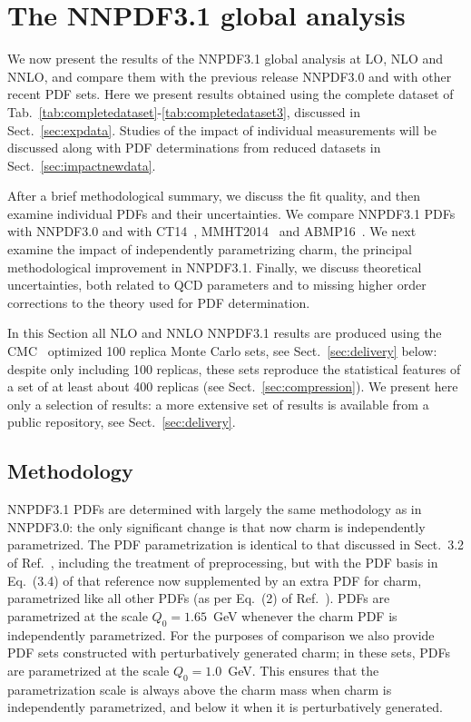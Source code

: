 \newpage
\section{The NNPDF3.1 global analysis}

\label{sec:results}

We now present the results of the NNPDF3.1 global
analysis at LO, NLO and NNLO, and compare them with the previous
release NNPDF3.0 and  with other recent PDF sets.
%
Here we present results obtained using  the complete dataset
of Tab.~\ref{tab:completedataset}-\ref{tab:completedataset3}, discussed 
in Sect.~\ref{sec:expdata}. Studies of the impact of individual
measurements will be discussed along with PDF determinations from reduced
datasets in Sect.~\ref{sec:impactnewdata}. 

After a brief methodological summary, 
we discuss the  fit quality, and 
then examine individual PDFs and their uncertainties.
We compare NNPDF3.1 PDFs with NNPDF3.0 and with  CT14~\cite{Dulat:2015mca}, MMHT2014~\cite{Harland-Lang:2014zoa} 
and ABMP16~\cite{Alekhin:2017kpj}. 
We next examine the impact of independently parametrizing
charm, the principal methodological 
improvement in NNPDF3.1. Finally, we discuss theoretical
uncertainties, both related to QCD parameters 
and to missing higher order corrections to the
theory used for PDF determination.

In this Section all NLO and NNLO NNPDF3.1 results are produced using
the CMC~\cite{Carrazza:2015hva} optimized 100 replica Monte Carlo sets,
see Sect.~\ref{sec:delivery} below: despite only
including 100 replicas, these sets reproduce  the statistical features
of a set of at least about 400 replicas (see 
Sect.~\ref{sec:compression}).  We present here only a selection of
results: a more extensive set of results is available from a public
repository, see  Sect.~\ref{sec:delivery}.

\subsection{Methodology}
\label{sec:methodology}

NNPDF3.1 PDFs are determined with largely the same methodology as in NNPDF3.0:
the only significant change is that now charm is independently
parametrized. The PDF parametrization is identical to that
discussed in Sect.~3.2 of Ref.~\cite{Ball:2014uwa}, including the
treatment of preprocessing, but with the PDF
basis in Eq.~(3.4) of that reference now supplemented by an extra PDF
for charm, parametrized like all other PDFs (as per Eq.~(2) of
Ref.~\cite{Ball:2016neh}).
PDFs are parametrized at the scale $Q_0=1.65$~GeV whenever the charm PDF
is independently parametrized. For the purposes of comparison we also provide PDF sets constructed with perturbatively 
generated charm; 
in these sets, PDFs are parametrized at the scale $Q_0=1.0$~GeV. This ensures  
that the parametrization scale is always above the charm mass when
charm is independently parametrized, and below it when it is
perturbatively generated. 

